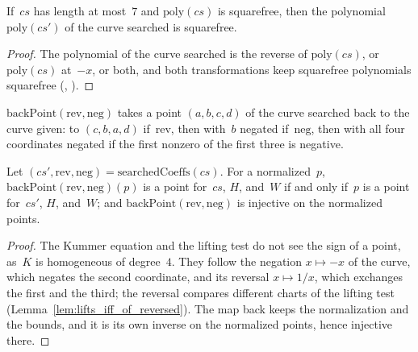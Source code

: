 \begin{lemma}\label{lem:squarefree_poly_searchedCoeffs}
  \leanok
  If~$cs$ has length at most~$7$ and $\mathrm{poly}(cs)$ is squarefree, then the polynomial
  $\mathrm{poly}(cs')$ of the curve searched is squarefree.
\end{lemma}

\begin{proof}\leanok
  The polynomial of the curve searched is the reverse of $\mathrm{poly}(cs)$, or
  $\mathrm{poly}(cs)$ at~$-x$, or both, and both transformations keep squarefree polynomials
  squarefree (, ).
\end{proof}

\begin{definition}\label{def:backPoint}
  \leanok
  $\mathrm{backPoint}(\mathrm{rev}, \mathrm{neg})$ takes a point $(a, b, c, d)$ of the curve
  searched back to the curve given: to $(c, b, a, d)$ if~$\mathrm{rev}$, then with~$b$ negated
  if~$\mathrm{neg}$, then with all four coordinates negated if the first nonzero of the first three
  is negative.
\end{definition}

\begin{lemma}
  \label{lem:isPoint_backPoint_iff}
  \leanok
  Let $(cs', \mathrm{rev}, \mathrm{neg}) = \mathrm{searchedCoeffs}(cs)$. For a normalized~$p$,
  $\mathrm{backPoint}(\mathrm{rev}, \mathrm{neg})(p)$ is a point for~$cs$, $H$, 
  and~$W$ if and only if~$p$ is a point for~$cs'$, $H$,  and~$W$; and
  $\mathrm{backPoint}(\mathrm{rev}, \mathrm{neg})$ is injective on the normalized points.
\end{lemma}

\begin{proof}\leanok
  The Kummer equation and the lifting test do not see the sign of a point, as~$K$ is homogeneous
  of degree~$4$. They follow the negation $x \mapsto -x$ of the curve, which negates the second
  coordinate, and its reversal $x \mapsto 1/x$, which exchanges the first and the third; the
  reversal compares different charts of the lifting test (Lemma~\ref{lem:lifts_iff_of_reversed}).
  The map back keeps the normalization and the bounds, and it is its own inverse on the normalized
  points, hence injective there.
\end{proof}

